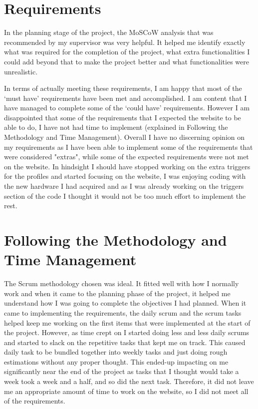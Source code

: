 \section {Requirements}
In the planning stage of the project, the MoSCoW analysis that was recommended by my supervisor was very helpful. It helped me identify exactly what was required for the completion of the project, what extra functionalities I could add beyond that to make the project better and what functionalities were unrealistic. 

In terms of actually meeting these requirements, I am happy that most of the ‘must have’ requirements have been met and accomplished.  I am content that  I have managed to complete some of the ‘could have’ requirements. However I am disappointed that some of the requirements that I expected the website to be able to do, I have not had time to implement (explained in Following the Methodology and Time Management). Overall I have no discerning opinion on my requirements as I have been able to implement some of the requirements that were considered "extras", while some of the expected requirements were not met on the website. In hindsight I should have stopped working on the extra triggers for the profiles and started focusing on the website, I was enjoying coding with the new hardware I had acquired and as I was already working on the triggers section of the code I thought it would not be too much effort to implement the rest. 

\section {Following the Methodology and Time Management}
The Scrum methodology chosen was ideal. It fitted well with how I normally work and when it came to the planning phase of the project, it helped me understand how I was going to complete the objectives I had planned. When it came to implementing the requirements, the daily scrum and the scrum tasks helped keep me working on the first items that were implemented at the start of the project. However, as time crept on I started doing less and less daily scrums and started to slack on the repetitive tasks that kept me on track. This caused daily task to be bundled together into weekly tasks and just doing rough estimations without any proper thought. This ended-up impacting on me significantly near the end of the project as tasks that I thought would take a week took a week and a half, and so did the next task. Therefore, it did not leave me an appropriate amount of time to work on the website, so I did not meet all of the requirements.

